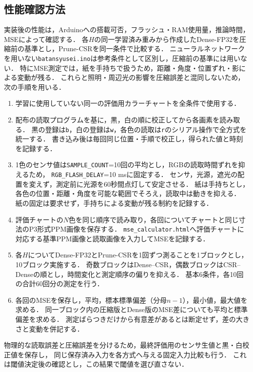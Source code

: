 \documentclass[a4paper,11pt]{article}
\begin{document}
\subsection{性能確認方法}

実装後の性能は，Arduinoへの搭載可否，フラッシュ・RAM使用量，推論時間，MSEによって確認する．
各$H$の同一学習済み重みから作成したDense-FP32を圧縮前の基準とし，Prune-CSRを同一条件で比較する．
ニューラルネットワークを用いない\texttt{batansyusei.ino}は参考条件として区別し，圧縮前の基準には用いない．
特にMSE測定では，紙を手持ちで扱うため，距離・角度・位置ずれ・影による変動が残る．
これらと照明・周辺光の影響を圧縮誤差と混同しないため，
次の手順を用いる．

\begin{enumerate}
  \item 学習に使用していない同一の評価用カラーチャートを全条件で使用する．
  \item 配布の読取プログラムを基に，黒，白の順に校正してから各画素を読み取る．
    黒の登録は\texttt{b}，白の登録は\texttt{w}，各色の読取は\texttt{r}のシリアル操作で全方式を統一する．
    書き込み後は毎回同じ位置・手順で校正し，得られた値と時刻を記録する．
  \item 1色のセンサ値は\texttt{SAMPLE\_COUNT}=10回の平均とし，RGBの読取時間ずれを抑えるため，
    \texttt{RGB\_FLASH\_DELAY}=10 msに固定する．
    センサ，光源，遮光の配置を変えず，測定前に光源を60秒間点灯して安定させる．
    紙は手持ちとし，各色の位置・距離・角度を可能な範囲でそろえ，読取中は動きを抑える．
    紙の固定は要求せず，手持ちによる変動が残る制約を記録する．
  \item 評価チャートの$N$色を同じ順序で読み取り，各回についてチャートと同じ寸法のP3形式PPM画像を保存する．
    \texttt{mse\_calculator.html}へ評価チャートに対応する基準PPM画像と読取画像を入力してMSEを記録する．
  \item 各$H$についてDense-FP32とPrune-CSRを1回ずつ測ることを1ブロックとし，10ブロック実施する．
    奇数ブロックはDense--CSR，偶数ブロックはCSR--Denseの順とし，時間変化と測定順序の偏りを抑える．
    基本6条件，各10回の合計60回分の測定を行う．
  \item 各回のMSEを保存し，平均，標本標準偏差（分母$n-1$），最小値，最大値を求める．
    同一ブロック内の圧縮版とDense版のMSE差についても平均と標準偏差を求める．
    測定ばらつきだけから有意差があるとは断定せず，差の大きさと変動を併記する．
\end{enumerate}

物理的な読取誤差と圧縮誤差を分けるため，最終評価用のセンサ生値と黒・白校正値を保存し，
同じ保存済み入力を各方式へ与える固定入力比較も行う．
これは閾値決定後の確認とし，この結果で閾値を選び直さない．
\end{document}
